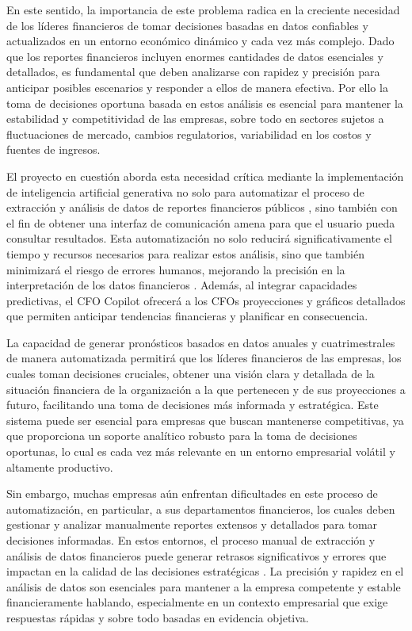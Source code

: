 \documentclass[12pt,letterpaper,oneside]{report}
\renewcommand{\_}{\UnderscoreOriginal\allowbreak}
\begin{document}
En este sentido, la importancia de este problema radica en la creciente necesidad de los líderes financieros de tomar decisiones basadas en datos confiables y actualizados en un entorno económico dinámico y cada vez más complejo. Dado que los reportes financieros incluyen enormes cantidades de datos esenciales y detallados, es fundamental que deben analizarse con rapidez y precisión para anticipar posibles escenarios y responder a ellos de manera efectiva. Por ello la toma de decisiones oportuna basada en estos análisis es esencial para mantener la estabilidad y competitividad de las empresas, sobre todo en sectores sujetos a fluctuaciones de mercado, cambios regulatorios, variabilidad en los costos y fuentes de ingresos.

El proyecto en cuestión aborda esta necesidad crítica mediante la implementación de inteligencia artificial generativa no solo para automatizar el proceso de extracción y análisis de datos de reportes financieros públicos \parencite{Jimnez2024}, sino también con el fin de obtener una interfaz de comunicación amena para que el usuario pueda consultar resultados. Esta automatización no solo reducirá significativamente el tiempo y recursos necesarios para realizar estos análisis, sino que también minimizará el riesgo de errores humanos, mejorando la precisión en la interpretación de los datos financieros \parencite{Ravi2021}. Además, al integrar capacidades predictivas, el CFO Copilot ofrecerá a los CFOs proyecciones y gráficos detallados que permiten anticipar tendencias financieras y planificar en consecuencia.

La capacidad de generar pronósticos basados en datos anuales y cuatrimestrales de manera automatizada \parencite{Arun2023} permitirá que los líderes financieros de las empresas, los cuales toman decisiones cruciales, obtener una visión clara y detallada de la situación financiera de la organización a la que pertenecen y de sus proyecciones a futuro, facilitando una toma de decisiones más informada y estratégica. Este sistema puede ser esencial para empresas que buscan mantenerse competitivas, ya que proporciona un soporte analítico robusto para la toma de decisiones oportunas, lo cual es cada vez más relevante en un entorno empresarial volátil y altamente productivo.

Sin embargo, muchas empresas aún enfrentan dificultades en este proceso de automatización, en particular, a sus departamentos financieros, los cuales deben gestionar y analizar manualmente reportes extensos y detallados para tomar decisiones informadas. En estos entornos, el proceso manual de extracción y análisis de datos financieros puede generar retrasos significativos y errores que impactan en la calidad de las decisiones estratégicas \parencite{Kanaparthi2024}. La precisión y rapidez en el análisis de datos son esenciales para mantener a la empresa competente y estable financieramente hablando, especialmente en un contexto empresarial que exige respuestas rápidas y sobre todo basadas en evidencia objetiva.
\end{document}
